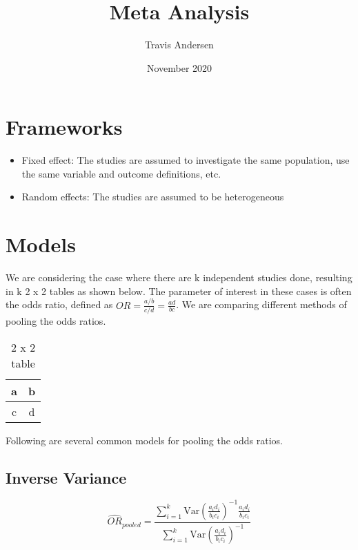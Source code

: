 \documentclass{article}
\title{Meta Analysis}
\author{Travis Andersen }
\date{November 2020}
\begin{document}
\maketitle

\section{Frameworks}

\begin{itemize}

    \item Fixed effect: The studies are assumed to investigate the same
    population, use the same variable and outcome definitions, etc.

    \item Random effects: The studies are assumed to be heterogeneous

\end{itemize}

\section{Models}

We are considering the case where there are k independent studies done,
resulting in k 2 x 2 tables as shown below. The parameter of interest in these
cases is often the odds ratio, defined as $OR = \frac{a/b}{c/d} = \frac{ad}{bc}$.
We are comparing different methods of pooling the odds ratios.

\begin{table}[h!]
\centering
    \begin{tabular}{|c|c|}
        \hline
        a & b \\
        \hline
        c & d \\
        \hline
    \end{tabular}
\caption{2 x 2 table}
\end{table}

Following are several common models for pooling the odds ratios.

\subsection{Inverse Variance}

\begin{equation}
    \hat{OR}_{pooled} = \frac
    {\sum_{i=1}^k \text{Var}(\frac{a_i d_i}{b_i c_i})^{-1} \frac{a_i d_i}{b_i c_i}}
    {\sum_{i=1}^k \text{Var}(\frac{a_i d_i}{b_i c_i})^{-1}}
\end{equation}
\end{document}
